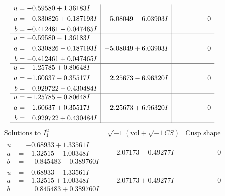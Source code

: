 \documentclass[1p]{elsarticle_modified}
\theoremstyle{definition}
\newcommand{\I}{\sqrt{-1}}
\begin{document}
$$\begin{array}{c|c|c}
\begin{aligned}
u &= -0.59580 + 1.36183 I \\
a &= \phantom{-}0.330826 + 0.187193 I \\
b &= -0.412461 - 0.047465 I\end{aligned}
 & -5.08049 - 6.03903 I & \phantom{-0.000000 } 0 \\ \hline\begin{aligned}
u &= -0.59580 - 1.36183 I \\
a &= \phantom{-}0.330826 - 0.187193 I \\
b &= -0.412461 + 0.047465 I\end{aligned}
 & -5.08049 + 6.03903 I & \phantom{-0.000000 } 0 \\ \hline\begin{aligned}
u &= -1.25785 + 0.80648 I \\
a &= -1.60637 - 0.35517 I \\
b &= \phantom{-}0.929722 - 0.430484 I\end{aligned}
 & \phantom{-}2.25673 - 6.96320 I & \phantom{-0.000000 } 0 \\ \hline\begin{aligned}
u &= -1.25785 - 0.80648 I \\
a &= -1.60637 + 0.35517 I \\
b &= \phantom{-}0.929722 + 0.430484 I\end{aligned}
 & \phantom{-}2.25673 + 6.96320 I & \phantom{-0.000000 } 0\\
 \hline 
 \end{array}$$\newpage$$\begin{array}{c|c|c}  
\text{Solutions to }I^u_{1}& \I (\text{vol} + \sqrt{-1}CS) & \text{Cusp shape}\\
 \hline 
\begin{aligned}
u &= -0.68933 + 1.33561 I \\
a &= -1.32515 - 1.00348 I \\
b &= \phantom{-}0.845483 - 0.389760 I\end{aligned}
 & \phantom{-}2.07173 - 0.49277 I & \phantom{-0.000000 } 0 \\ \hline\begin{aligned}
u &= -0.68933 - 1.33561 I \\
a &= -1.32515 + 1.00348 I \\
b &= \phantom{-}0.845483 + 0.389760 I\end{aligned}
 & \phantom{-}2.07173 + 0.49277 I & \phantom{-0.000000 } 0 \\ \hline\begin{aligned}

\end{aligned}
\end{array}$$
\end{document}
